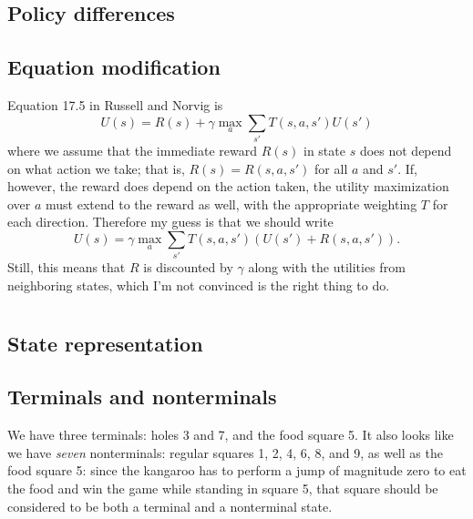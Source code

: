 \documentclass[letterpaper, 10pt]{article}
\begin{document}
\begin{multicols}{2}
\subsection{Policy differences}


\subsection{Equation modification}
Equation 17.5 in Russell and Norvig is 
\[ U(s) = R(s) + \gamma \max_a \sum_{s'} T(s, a, s') U(s') \]
where we assume that the immediate reward $R(s)$ in state $s$ does not depend on what action we take; that is, $R(s) = R(s, a, s')$ for all $a$ and $s'$. 
If, however, the reward does depend on the action taken, the utility maximization over $a$ must extend to the reward as well, with the appropriate weighting $T$ for each direction. 
Therefore my guess is that we should write 
\[  U(s) = \gamma \max_a \sum_{s'} T(s, a, s') \left( U(s') + R(s, a, s') \right). \]
Still, this means that $R$ is discounted by $\gamma$ along with the utilities from neighboring states, which I'm not convinced is the right thing to do. 

\section{}
\subsection{State representation}


\subsection{Terminals and nonterminals}
We have three terminals: holes 3 and 7, and the food square 5. It also looks like we have \emph{seven} nonterminals: regular squares 1, 2, 4, 6, 8, and 9, as well as the food square 5: since the kangaroo has to perform a jump of magnitude zero to eat the food and win the game while standing in square 5, that square should be considered to be both a terminal and a nonterminal state. 


\end{multicols}
\end{document}
